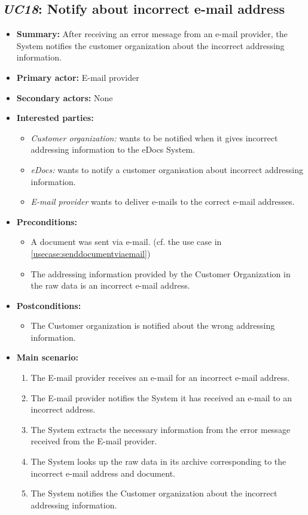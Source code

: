 \documentclass[a4paper,10pt]{article}
\begin{document}
\subsection{\emph{UC18}: Notify about incorrect e-mail address}
\begin{itemize}
    \item \textbf{Summary:} After receiving an error message from an e-mail provider, the System notifies the customer organization about the incorrect addressing information.
    \item \textbf{Primary actor:} E-mail provider
	\item \textbf{Secondary actors:} None
    \item \textbf{Interested parties:} 
        \begin{itemize}
            \item \textit{Customer organization:} wants to be notified when it gives incorrect addressing information to the eDocs System.
            \item \textit{eDocs:} wants to notify a customer organisation about incorrect addressing information.
            \item \textit{E-mail provider} wants to deliver e-mails to the correct e-mail addresses.
        \end{itemize}

    \item \textbf{Preconditions:}
        \begin{itemize}
            \item A document was sent via e-mail. (cf. the use case in \ref{usecase:senddocumentviaemail})
            \item The addressing information provided by the Customer Organization in the raw data is an incorrect e-mail address.
        \end{itemize}

    \item \textbf{Postconditions:}
        \begin{itemize}
            \item The Customer organization is notified about the wrong addressing information.
        \end{itemize}
        
    \item \textbf{Main scenario:} 
    \begin{enumerate}
       \item The E-mail provider receives an e-mail for an incorrect e-mail address.
       \item The E-mail provider notifies the System it has received an e-mail to an incorrect address.
       \item The System extracts the necessary information from the error message received from the E-mail provider.
       \item The System looks up the raw data in its archive corresponding to the incorrect e-mail address and document.
       \item The System notifies the Customer organization about the incorrect addressing information.
    \end{enumerate}
\end{itemize}
\end{document}
